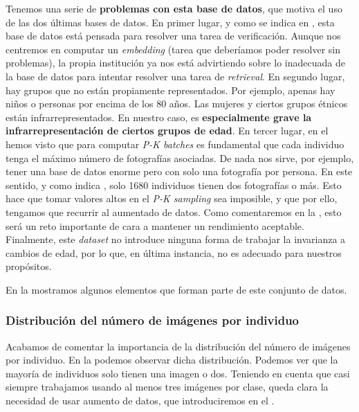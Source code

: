 Tenemos una serie de \textbf{problemas con esta base de datos}, que motiva el uso de las dos últimas bases de datos. En primer lugar, y como se indica en \cite{informatica:lfw_dataset}, esta base de datos está pensada para resolver una tarea de verificación. Aunque nos centremos en computar un \textit{embedding} (tarea que deberíamos poder resolver sin problemas), la propia institución ya nos está advirtiendo sobre lo inadecuada de la base de datos para intentar resolver una tarea de \textit{retrieval}. En segundo lugar, hay grupos que no están propiamente representados. Por ejemplo, apenas hay niños o personas por encima de los 80 años. Las mujeres y ciertos grupos étnicos están infrarrepresentados. En nuestro caso, es \textbf{especialmente grave la infrarrepresentación de ciertos grupos de edad}. En tercer lugar, en el  hemos visto que para computar \textit{P-K batches} es fundamental que cada individuo tenga el máximo número de fotografías asociadas. De nada nos sirve, por ejemplo, tener una base de datos enorme pero con solo una fotografía por persona. En este sentido, y como indica \cite{informatica:lfw_dataset}, solo 1680 individuos tienen dos fotografías o más. Esto hace que tomar valores altos en el \textit{P-K sampling} sea imposible, y que por ello, tengamos que recurrir al aumentado de datos. Como comentaremos en la , esto será un reto importante de cara a mantener un rendimiento aceptable. Finalmente, este \textit{dataset} no introduce ninguna forma de trabajar la invarianza a cambios de edad, por lo que, en última instancia, no es adecuado para nuestros propósitos.

En la  mostramos algunos elementos que forman parte de este conjunto de datos.

\subsubsection{Distribución del número de imágenes por individuo} \label{isubsubs:imagenes_por_clase_lfw}

Acabamos de comentar la importancia de la distribución del número de imágenes por individuo. En la  podemos observar dicha distribución. Podemos ver que la mayoría de individuos solo tienen una imagen o dos. Teniendo en cuenta que casi siempre trabajamos usando al menos tres imágenes por clase, queda clara la necesidad de usar aumento de datos, que introduciremos en el .


